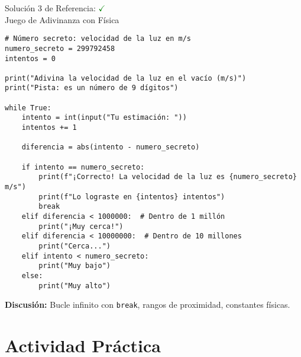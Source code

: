 \documentclass[10pt]{beamer}
\begin{document}
\begin{frame}[fragile]{Solución 3 de Referencia: \hfill \textcolor{green}{$\checkmark$} \\ Juego de Adivinanza con Física}
\begin{verbatim}
# Número secreto: velocidad de la luz en m/s
numero_secreto = 299792458
intentos = 0

print("Adivina la velocidad de la luz en el vacío (m/s)")
print("Pista: es un número de 9 dígitos")

while True:
    intento = int(input("Tu estimación: "))
    intentos += 1
    
    diferencia = abs(intento - numero_secreto)
    
    if intento == numero_secreto:
        print(f"¡Correcto! La velocidad de la luz es {numero_secreto} m/s")
        print(f"Lo lograste en {intentos} intentos")
        break
    elif diferencia < 1000000:  # Dentro de 1 millón
        print("¡Muy cerca!")
    elif diferencia < 10000000:  # Dentro de 10 millones
        print("Cerca...")
    elif intento < numero_secreto:
        print("Muy bajo")
    else:
        print("Muy alto")
\end{verbatim}
\textbf{Discusión:} Bucle infinito con \texttt{break}, rangos de proximidad, constantes físicas.
\end{frame}

\section{Actividad Práctica}
\end{document}
